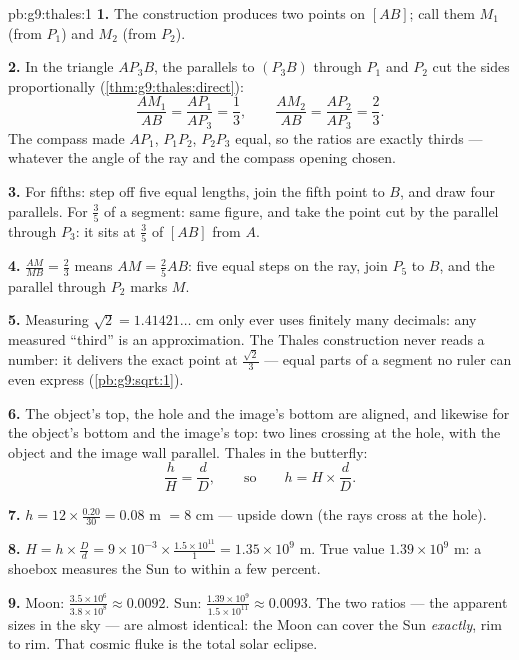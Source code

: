 \begin{solution}{pb:g9:thales:1}
\textbf{1.} The construction produces two points on $[AB]$;
call them $M_1$ (from $P_1$) and $M_2$ (from $P_2$).

\textbf{2.} In the triangle $A P_3 B$, the parallels to
$(P_3 B)$ through $P_1$ and $P_2$ cut the sides
proportionally (\cref{thm:g9:thales:direct}):
\[
\frac{A M_1}{AB} = \frac{A P_1}{A P_3} = \frac13,
\qquad
\frac{A M_2}{AB} = \frac{A P_2}{A P_3} = \frac23 .
\]
The compass made $A P_1$, $P_1 P_2$, $P_2 P_3$ equal, so the
ratios are exactly thirds --- whatever the angle of the ray and
the compass opening chosen.

\textbf{3.} For fifths: step off five equal lengths, join the
fifth point to $B$, and draw four parallels. For $\frac35$ of a
segment: same figure, and take the point cut by the parallel
through $P_3$: it sits at $\frac{3}{5}$ of $[AB]$ from $A$.

\textbf{4.} $\frac{AM}{MB} = \frac23$ means
$AM = \frac25 AB$: five equal steps on the ray, join $P_5$ to
$B$, and the parallel through $P_2$ marks $M$.

\textbf{5.} Measuring $\sqrt2 = 1.41421\ldots$ cm only ever uses
finitely many decimals: any measured ``third'' is an
approximation. The Thales construction never reads a number: it
delivers the exact point at $\frac{\sqrt2}{3}$ --- equal parts
of a segment no ruler can even express
(\cref{pb:g9:sqrt:1}).

\textbf{6.} The object's top, the hole and the image's bottom
are aligned, and likewise for the object's bottom and the
image's top: two lines crossing at the hole, with the object
and the image wall parallel. Thales in the butterfly:
\[
\frac{h}{H} = \frac{d}{D},
\qquad\text{so}\qquad
h = H \times \frac dD .
\]

\textbf{7.} $h = 12 \times \frac{0.20}{30} = 0.08$ m $= 8$ cm
--- upside down (the rays cross at the hole).

\textbf{8.} $H = h \times \frac Dd = 9 \times 10^{-3} \times
\frac{1.5 \times 10^{11}}{1} = 1.35 \times 10^{9}$ m. True
value $1.39 \times 10^9$ m: a shoebox measures the Sun to
within a few percent.

\textbf{9.} Moon: $\frac{3.5 \times 10^6}{3.8 \times 10^8}
\approx 0.0092$. Sun: $\frac{1.39 \times 10^9}{1.5 \times
10^{11}} \approx 0.0093$. The two ratios --- the apparent sizes
in the sky --- are almost identical: the Moon can cover the Sun
\emph{exactly}, rim to rim. That cosmic fluke is the total
solar eclipse.


\end{solution}
